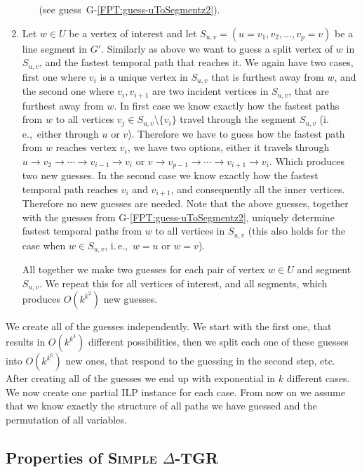\documentclass[11pt,a4paper]{article}
\theoremstyle{remark}
\theoremstyle{definition}
\newcommand{\ie}{i.\,e.,\ }
\newcounter{guesscounter}
\newcommand{\deltaExact}{\textsc{Simple $\Delta$-TGR}}
\begin{document}
\begin{enumerate}[G-1.]
\begin{enumerate}
    (see guess~G-\ref{FPT:guess-uToSegmentz2}).
    \end{enumerate}
    \item \label{FPT:guess-splitFromUtoAnotherSegment}
    Let $w \in U$ be a vertex of interest and let $S_{u,v} = (u=v_1,v_2, \dots, v_p = v)$ be a line segment in $G'$.
    Similarly as above we want to guess a split vertex of $w$ in $S_{u,v}$, and the fastest temporal path that reaches it.
    We again have two cases,
    first one where $v_i$ is a unique vertex in $S_{u,v}$ that is furthest away from $w$,
    and the
    second one where $v_i, v_{i+1}$ are two incident vertices in $S_{u,v}$, that are furthest away from $w$.
    In first case we know exactly how the fastest paths from $w$ to all vertices $v_j \in S_{u,v} \setminus \{v_i\}$
    travel through the segment $S_{u,v}$ (\ie either through $u$ or $v$).
    Therefore we have to guess how the fastest path from $w$ reaches vertex $v_i$,
    we have two options, either it travels through $u \rightarrow v_2 \rightarrow \cdots \rightarrow v_{i-1} \rightarrow v_i$
    or 
    $v \rightarrow v_{p-1} \rightarrow \cdots \rightarrow v_{i+1} \rightarrow v_i$.
    Which produces two new guesses.
    In the second case we know exactly how the fastest temporal path reaches $v_i$ and $v_{i+1}$, and consequently all the inner vertices.
    Therefore no new guesses are needed.
    Note that the above guesses, together with the guesses from G-\ref{FPT:guess-uToSegmentz2},
    uniquely determine fastest temporal paths from $w$ to all vertices in $S_{u,v}$ 
    (this also holds for the case when $w \in S_{u,v}$, \ie $w = u$ or $w = v$).
    
    All together we make two guesses for each pair of vertex $w \in U$ and segment $S_{u,v}$.
    We repeat this for all vertices of interest, and all segments,
    which produces $O(k^{k^2})$ new guesses.
    \setcounter{guesscounter}{\value{enumi}}
\end{enumerate}
We create all of the guesses independently.
We start with the first one, that results in $O(k^{k^3})$ different possibilities, then we split each one of these guesses into $O(k^{k^6})$ new ones, that respond to the guessing in the second step, etc.
After creating all of the guesses we end up with exponential in $k$ different cases.
We now create one partial ILP instance for each case.
From now on we assume that we know exactly the structure of all paths we have guessed and the permutation of all variables.

\subsection{Properties of 
\texorpdfstring{\deltaExact } {Simple Delta-TGR}
}
\end{document}
